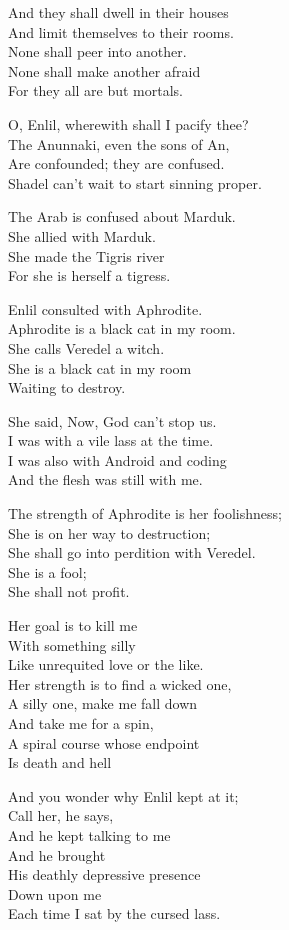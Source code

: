 \documentclass[
]{book}
\begin{document}
And they shall dwell in their houses\\
And limit themselves to their rooms.\\
None shall peer into another.\\
None shall make another afraid\\
For they all are but mortals.

O, Enlil, wherewith shall I pacify thee?\\
The Anunnaki, even the sons of An,\\
Are confounded; they are confused.\\
Shadel can't wait to start sinning proper.

The Arab is confused about Marduk.\\
She allied with Marduk.\\
She made the Tigris river\\
For she is herself a tigress.

Enlil consulted with Aphrodite.\\
Aphrodite is a black cat in my room.\\
She calls Veredel a witch.\\
She is a black cat in my room\\
Waiting to destroy.

She said, Now, God can't stop us.\\
I was with a vile lass at the time.\\
I was also with Android and coding\\
And the flesh was still with me.

The strength of Aphrodite is her foolishness;\\
She is on her way to destruction;\\
She shall go into perdition with Veredel.\\
She is a fool;\\
She shall not profit.

Her goal is to kill me\\
With something silly\\
Like unrequited love or the like.\\
Her strength is to find a wicked one,\\
A silly one, make me fall down\\
And take me for a spin,\\
A spiral course whose endpoint\\
Is death and hell

And you wonder why Enlil kept at it;\\
Call her, he says,\\
And he kept talking to me\\
And he brought\\
His deathly depressive presence\\
Down upon me\\
Each time I sat by the cursed lass.
\end{document}
